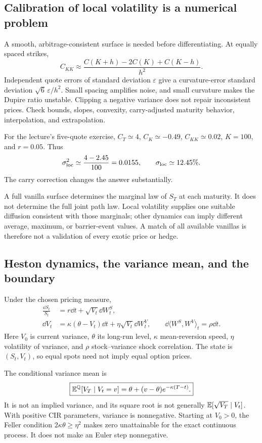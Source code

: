 \subsection{Calibration of local volatility is a numerical problem}
A smooth, arbitrage-consistent surface is needed before differentiating.
At equally spaced strikes,
\[
C_{KK}\approx\frac{C(K+h)-2C(K)+C(K-h)}{h^2}.
\]
Independent quote errors of standard deviation \(\varepsilon\) give a
curvature-error standard deviation \(\sqrt6\,\varepsilon/h^2\).
Small spacing amplifies noise, and small curvature makes the Dupire ratio
unstable. Clipping a negative variance does not repair inconsistent prices.
Check bounds, slopes, convexity, carry-adjusted maturity behavior,
interpolation, and extrapolation.

For the lecture's five-quote exercise,
\(C_T\simeq4\), \(C_K\simeq-0.49\), \(C_{KK}\simeq0.02\),
\(K=100\), and \(r=0.05\). Thus
\[
\sigma_{\rm loc}^2\simeq\frac{4-2.45}{100}=0.0155,
\qquad \sigma_{\rm loc}\simeq12.45\%.
\]
The carry correction changes the answer substantially.

A full vanilla surface determines the marginal law of \(S_T\) at each
maturity. It does not determine the full joint path law. Local volatility
supplies one suitable diffusion consistent with those marginals; other
dynamics can imply different average, maximum, or barrier-event values.
A match of all available vanillas is therefore not a validation of every
exotic price or hedge.

\subsection{Heston dynamics, the variance mean, and the boundary}
Under the chosen pricing measure,
\[
\boxed{\begin{aligned}
\frac{\dd S_t}{S_t}&=r\dd t+\sqrt{V_t}\dd W_t^S,\\
\dd V_t&=\kappa(\theta-V_t)\dd t+\eta\sqrt{V_t}\dd W_t^V,
\qquad\dd\langle W^S,W^V\rangle_t=\rho\dd t.
\end{aligned}}
\]
Here \(V_0\) is current variance, \(\theta\) its long-run level,
\(\kappa\) mean-reversion speed, \(\eta\) volatility of variance, and
\(\rho\) stock--variance shock correlation. The state is \((S_t,V_t)\),
so equal spots need not imply equal option prices.

The conditional variance mean is
\[
\boxed{\mathbb{E}^{\mathbb{Q}}[V_T\mid V_t=v]
=\theta+(v-\theta)e^{-\kappa(T-t)}.}
\]
It is not an implied variance, and its square root is not generally
\(\mathbb{E}[\sqrt{V_T}\mid V_t]\). With positive CIR parameters, variance is
nonnegative. Starting at \(V_0>0\), the Feller condition
\(2\kappa\theta\geq\eta^2\) makes zero unattainable for the exact
continuous process. It does not make an Euler step nonnegative.

